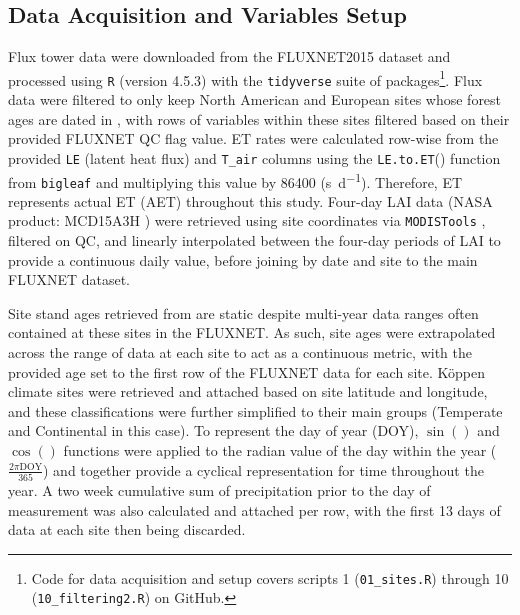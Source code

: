 \subsection{Data Acquisition and Variables Setup}
Flux tower data were downloaded from the FLUXNET2015 dataset \cite{fluxnet2015} and processed using \texttt{R} (version 4.5.3) \parencite{why_R_you_reading_this} with the \texttt{tidyverse} \parencite{tidy_this_up} suite of packages\footnote{Code for data acquisition and setup covers scripts 1 (\texttt{01\_sites.R}) through 10 (\texttt{10\_filtering2.R}) on GitHub.}. Flux data were filtered to only keep North American and European sites whose forest ages are dated in \textcite{besnard2018}, with rows of variables within these sites filtered based on their provided FLUXNET QC flag value. \ac{ET} rates were calculated row-wise from the provided \texttt{LE} (latent heat flux) and \texttt{T\_air} columns using the \texttt{LE.to.ET}() function from \texttt{bigleaf} \parencite{a_large_leaf} and multiplying this value by 86400 (\si{\second\per\day}). Therefore, \ac{ET} represents actual \ac{ET} (AET) throughout this study. Four-day LAI data (NASA product: MCD15A3H \parencite{myneni2015}) were retrieved using site coordinates via \texttt{MODISTools} \parencite{hufkens2023bluegreen}, filtered on QC, and linearly interpolated between the four-day periods of LAI to provide a continuous daily value, before joining by date and site to the main FLUXNET dataset.\par Site stand ages retrieved from \textcite{besnard2018} are static despite multi-year data ranges often contained at these sites in the FLUXNET. As such, site ages were extrapolated across the range of data at each site to act as a continuous metric, with the provided age set to the first row of the FLUXNET data for each site. K\"{o}ppen climate sites were retrieved and attached based on site latitude and longitude, and these classifications were further simplified to their main groups (Temperate and Continental in this case). To represent the day of year (DOY), $\sin()$ and $\cos()$ functions were applied to the radian value of the day within the year ($\frac{2 \pi \mathrm{DOY}}{365}$) and together provide a cyclical representation for time throughout the year. A two week cumulative sum of precipitation prior to the day of measurement was also calculated and attached per row, with the first 13 days of data at each site then being discarded. 



